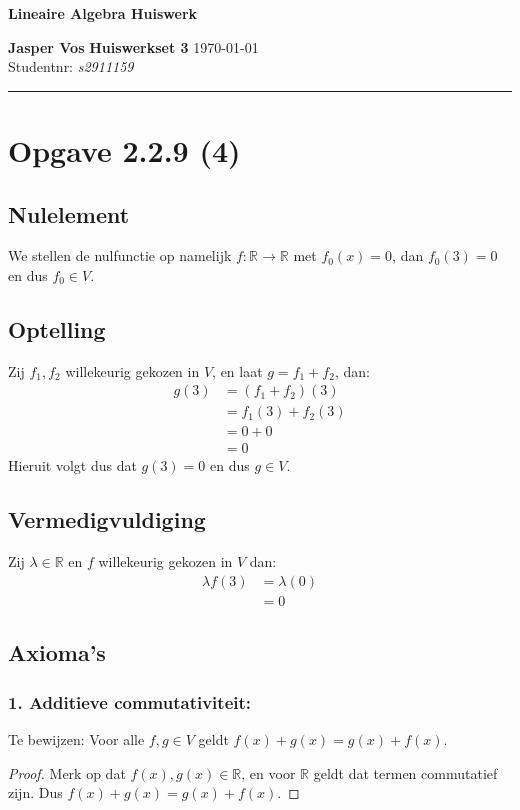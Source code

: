 \documentclass{article}
\newcommand{\R}{\mathbb{R}}
\begin{document}
{\Large \textbf{Lineaire Algebra Huiswerk}}

\bigskip

\textbf{Jasper Vos} \hfill \textbf{Huiswerkset 3} \hfill \today \\
Studentnr: \emph{s2911159}

\rule{\textwidth}{2pt}

\bigskip

\section*{Opgave 2.2.9 (4)}
\subsection*{Nulelement}
We stellen de nulfunctie op namelijk $f: \R \rightarrow \R$ met $f_0(x) = 0$, dan $f_0(3) = 0$ en dus $f_0 \in V$.
\subsection*{Optelling}
Zij $f_1, f_2$ willekeurig gekozen in $V$, en laat $g = f_1 + f_2$, dan:
\begin{align*}
    g(3) & = (f_1 + f_2)(3)  \\
         & = f_1(3) + f_2(3) \\
         & = 0 + 0           \\
         & = \boxed{0}
\end{align*}
Hieruit volgt dus dat $g(3) = 0$ en dus $g \in V$.
\subsection*{Vermedigvuldiging}
Zij $\lambda \in \R$ en $f$ willekeurig gekozen in $V$ dan:
\begin{align*}
    \lambda f(3) & = \lambda (0) \\
                 & = \boxed{0}
\end{align*}
\subsection*{Axioma's}
\subsubsection*{1. Additieve commutativiteit:}
Te bewijzen: Voor alle $f, g \in V$ geldt $f(x) + g(x) = g(x) + f(x)$.
\begin{proof}
    Merk op dat $f(x), g(x) \in \R$, en voor $\R$ geldt dat termen commutatief zijn.
    Dus $f(x) + g(x) = g(x) + f(x)$.
\end{proof}
\end{document}

